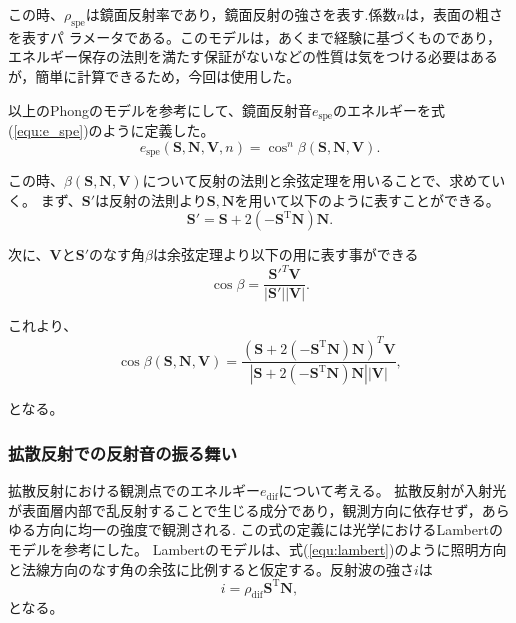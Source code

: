 この時、$\rho_\mathrm{spe}$は鏡面反射率であり，鏡面反射の強さを表す.係数$n$は，表面の粗さを表すパ ラメータである。このモデルは，あくまで経験に基づくものであり，エネルギー保存の法則を満たす保証がないなどの性質は気をつける必要はあるが，簡単に計算できるため，今回は使用した。

以上のPhongのモデルを参考にして、鏡面反射音$e_\mathrm{spe}$のエネルギーを式(\ref{equ:e_spe})のように定義した。
\begin{equation}
    \label{equ:e_spe}
      e_\mathrm{spe}(\mathbf{S}, \mathbf{N}, \mathbf{V}, n) = \cos^{n}\beta(\mathbf{S}, \mathbf{N}, \mathbf{V}).
\end{equation}

この時、$\beta(\mathbf{S}, \mathbf{N}, \mathbf{V})$について反射の法則と余弦定理を用いることで、求めていく。
まず、$\mathbf{S'}$は反射の法則より$\mathbf{S}, \mathbf{N}$を用いて以下のように表すことができる。
\begin{equation}
	\mathbf{S'} = \mathbf{S} + 2(- \mathbf{S}^{\mathrm{T}} \mathbf{N}) \mathbf{N}.
\end{equation}

次に、$\mathbf{V}$と$\mathbf{S'}$のなす角$\beta$は余弦定理より以下の用に表す事ができる
\begin{equation}
	\cos\beta = \frac{\mathbf{S'}^{T}\mathbf{V}}{|\mathbf{S'}||\mathbf{V}|}.
\end{equation}

これより、
\begin{equation}
	\cos\beta(\mathbf{S}, \mathbf{N}, \mathbf{V}) = \frac{(\mathbf{S} + 2(- \mathbf{S}^{\mathrm{T}} \mathbf{N}) \mathbf{N})^{T}\mathbf{V}}{|\mathbf{S} + 2(- \mathbf{S}^{\mathrm{T}} \mathbf{N}) \mathbf{N}||\mathbf{V}|},
\end{equation}

となる。

\subsubsection{拡散反射での反射音の振る舞い\label{diff}}
拡散反射における観測点でのエネルギー$e_\mathrm{dif}$について考える。
拡散反射が入射光が表面層内部で乱反射することで生じる成分であり，観測方向に依存せず，あらゆる方向に均一の強度で観測される.
この式の定義には光学におけるLambertのモデル\cite{micheal1994diffusereflection}を参考にした。
Lambertのモデルは、式(\ref{equ:lambert})のように照明方向と法線方向のなす角の余弦に比例すると仮定する。反射波の強さ$i$は
\begin{equation}
	\label{equ:lambert}
	i = \rho_\mathrm{dif}\mathbf{S}^{\mathrm{T}}\mathbf{N},
\end{equation}
となる。

